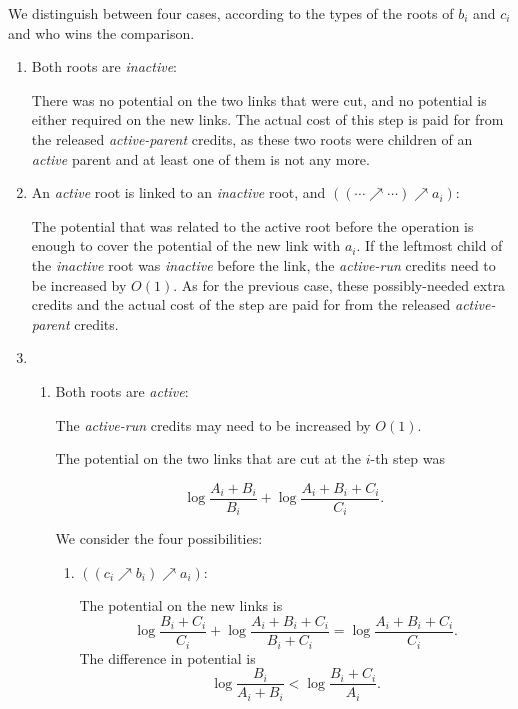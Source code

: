 We distinguish between four cases, according to the types of the roots of $b_i$ and $c_i$ and who wins the comparison.


\begin{enumerate}

\item Both roots are {\it inactive}:  

There was no potential on the two links that were cut, and no potential is either required on the new links. The actual cost of this step is paid for from the released {\it active-parent} credits, as these two roots were children of an {\it active} parent and at least one of them is not any more. \\
 
 
\item An {\it active} root is linked to an {\it inactive} root, and $((\cdots \nearrow \cdots) \nearrow a_i)$: 

The potential that was related to the active root before the operation is enough to cover the potential of the new link with $a_i$.
If the leftmost child of the {\it inactive} root was {\it inactive} before the link, the {\it active-run} credits need to be increased by $O(1)$.  
As for the previous case, these possibly-needed extra credits and the actual cost of the step are paid for from the released {\it active-parent} credits. \\
 
 
\item 

\begin{enumerate}

\item Both roots are {\it active}: 

The {\it active-run} credits may need to be increased by $O(1)$.

The potential on the two links that are cut at the $i$-th step was

\[\log{\frac{A_i+B_i}{B_i}} + \log{\frac{A_i+B_i+C_i}{C_i}}.\] 

We consider the four possibilities: \\


\begin{enumerate}

\item $((c_i \nearrow b_i) \nearrow a_i)$:

The potential on the new links is 
\[\log{\frac{B_i+C_i}{C_i}} + \log{\frac{A_i+B_i+C_i}{B_i+C_i}} = \log{\frac{A_i+B_i+C_i}{C_i}}.\]
The difference in potential is 
\[\log{\frac{B_i}{A_i+B_i}} < \log{\frac{B_i+C_i}{A_i}}.\] 
 

\end{enumerate}
\end{enumerate}
\end{enumerate}
